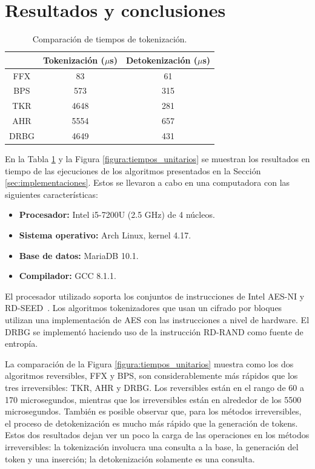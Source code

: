\documentclass[conference]{IEEEtran}
\begin{document}
  \section{Resultados y conclusiones}
  \label{sec:conclusiones}

  \begin{table}
    \renewcommand{\arraystretch}{1.3}
    \centering
    \caption{Comparación de tiempos de tokenización.}
    \label{tabla:tiempos_tokenizacion}
    \begin{tabular}{c c c}
      \hline
       & Tokenización ($\mu$s) & Detokenización ($\mu$s) \\
      \hline
      FFX & 83 & 61 \\
      BPS & 573 & 315 \\
      TKR & 4648 & 281 \\
      AHR & 5554 & 657 \\
      DRBG & 4649 & 431 \\
      \hline
    \end{tabular}
  \end{table}

  En la Tabla \ref{tabla:tiempos_tokenizacion} y la Figura
  \ref{figura:tiempos_unitarios} se muestran los resultados en tiempo de las
  ejecuciones de los algoritmos presentados en la Sección
  \ref{sec:implementaciones}. Estos se llevaron a cabo en una computadora con
  las siguientes características:

  \begin{itemize}
    \item \textbf{Procesador:} Intel i5-7200U (2.5 GHz) de 4 núcleos.
    \item \textbf{Sistema operativo:} Arch Linux, kernel 4.17.
    \item \textbf{Base de datos:} MariaDB 10.1.
    \item \textbf{Compilador:} GCC 8.1.1.
  \end{itemize}

  El procesador utilizado soporta los conjuntos de instrucciones de Intel AES-NI
  y RD-SEED~\cite{aesni_wp}. Los algoritmos tokenizadores que usan un cifrado
  por bloques utilizan una implementación de AES con las instrucciones a nivel
  de hardware. El DRBG se implementó haciendo uso de la instrucción RD-RAND como
  fuente de entropía.

  La comparación de la Figura \ref{figura:tiempos_unitarios} muestra como los
  dos algoritmos reversibles, FFX y BPS, son considerablemente más rápidos que
  los tres irreversibles: TKR, AHR y DRBG. Los reversibles están en el rango de
  60 a 170 microsegundos, mientras que los irreversibles están en alrededor de
  los 5500 microsegundos. También es posible observar que, para los métodos
  irreversibles, el proceso de detokenización es mucho más rápido que la
  generación de tokens.  Estos dos resultados dejan ver un poco la carga de las
  operaciones en los métodos irreversibles: la tokenización involucra una
  consulta a la base, la generación del token y una inserción; la detokenización
  solamente es una consulta.
\end{document}
